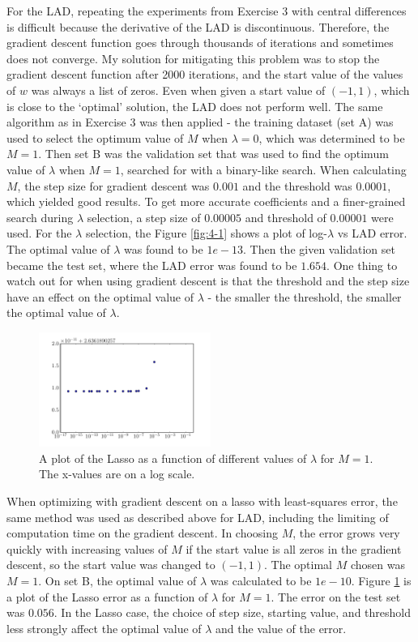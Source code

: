 \documentclass[10pt]{article}
\begin{document}
For the LAD, repeating the experiments from Exercise 3 with central differences is difficult because the derivative of the LAD is discontinuous. Therefore, the gradient descent function goes through thousands of iterations and sometimes does not converge. My solution for mitigating this problem was to stop the gradient descent function after 2000 iterations, and the start value of the values of $w$ was always a list of zeros. Even when given a start value of $(-1, 1)$, which is close to the `optimal' solution, the LAD does not perform well. The same algorithm as in Exercise 3 was then applied - the training dataset (set A) was used to select the optimum value of $M$ when $\lambda = 0$, which was determined to be $M = 1$. Then set B was the validation set that was used to find the optimum value of $\lambda$ when $M = 1$, searched for with a binary-like search. When calculating $M$, the step size for gradient descent was $0.001$ and the threshold was $0.0001$, which yielded good results. To get more accurate coefficients and a finer-grained search during $\lambda$ selection, a step size of $0.00005$ and threshold of $0.00001$ were used. For the $\lambda$ selection, the  Figure \ref{fig:4-1} shows a plot of log-$\lambda$ vs LAD error. The optimal value of $\lambda$ was found to be $1e-13$. Then the given validation set became the test set, where the LAD error was found to be $1.654$. One thing to watch out for when using gradient descent is that the threshold and the step size have an effect on the optimal value of $\lambda$ - the smaller the threshold, the smaller the optimal value of $\lambda$. 

\begin{figure}[!ht]
	\centering
	\includegraphics[width=0.5\textwidth]{exercise4-2.pdf}
	\caption{A plot of the Lasso as a function of different values of $\lambda$ for $M = 1$. The x-values are on a log scale.}
	\label{fig:4-2}
\end{figure}

When optimizing with gradient descent on a lasso with least-squares error, the same method was used as described above for LAD, including the limiting of computation time on the gradient descent. In choosing $M$, the error grows very quickly with increasing values of $M$ if the start value is all zeros in the gradient descent, so the start value was changed to $(-1, 1)$. The optimal $M$ chosen was $M = 1$. On set B, the optimal value of $\lambda$ was calculated to be $1e-10$. Figure \ref{fig:4-2} is a plot of the Lasso error as a function of $\lambda$ for $M = 1$. The error on the test set was $0.056$. In the Lasso case, the choice of step size, starting value, and threshold less strongly affect the optimal value of $\lambda$ and the value of the error. 
\end{document}
